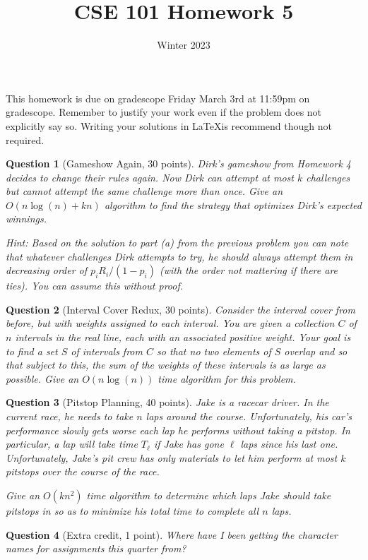 \documentclass{article}
\title{CSE 101 Homework 5}
\date{Winter 2023}
\newtheorem{ques}{Question}
\begin{document}
\maketitle

This homework is due on gradescope Friday March 3rd at 11:59pm on gradescope. Remember to justify your work even if the problem does not explicitly say so. Writing your solutions in \LaTeX is recommend though not required.

\begin{ques}[Gameshow Again, 30 points]
Dirk's gameshow from Homework 4 decides to change their rules again. Now Dirk can attempt at most $k$ challenges but \emph{cannot} attempt the same challenge more than once. Give an $O(n\log(n)+kn)$ algorithm to find the strategy that optimizes Dirk's expected winnings. 

Hint: Based on the solution to part (a) from the previous problem you can note that whatever challenges Dirk attempts to try, he should always attempt them in decreasing order of $p_i R_i / (1-p_i)$ (with the order not mattering if there are ties). You can assume this without proof.
\end{ques}

\begin{ques}[Interval Cover Redux, 30 points]
Consider the interval cover from before, but with weights assigned to each interval. You are given a collection $C$ of $n$ intervals in the real line, each with an associated positive weight. Your goal is to find a set $S$ of intervals from $C$ so that no two elements of $S$ overlap and so that subject to this, the sum of the weights of these intervals is as large as possible. Give an $O(n \log(n))$ time algorithm for this problem.
\end{ques}

\begin{ques}[Pitstop Planning, 40 points]
Jake is a racecar driver. In the current race, he needs to take $n$ laps around the course. Unfortunately, his car's performance slowly gets worse each lap he performs without taking a pitstop. In particular, a lap will take time $T_\ell$ if Jake has gone $\ell$ laps since his last one. Unfortunately, Jake's pit crew has only materials to let him perform at most $k$ pitstops over the course of the race.

Give an $O(kn^2)$ time algorithm to determine which laps Jake should take pitstops in so as to minimize his total time to complete all $n$ laps.
\end{ques}

\begin{ques}[Extra credit, 1 point]
Where have I been getting the character names for assignments this quarter from?
\end{ques}
\end{document}
